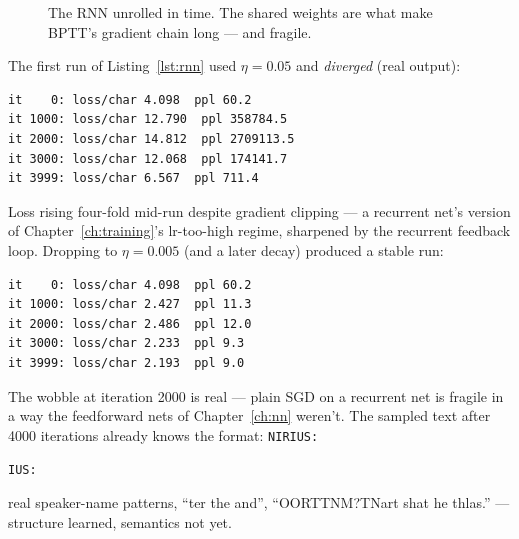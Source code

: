 \begin{figure}[htbp]
\centering
{}
\caption{The RNN unrolled in time. The shared weights are what make
BPTT's gradient chain long --- and fragile.}
\label{fig:unrolled}
\end{figure}



\begin{example}
\label{ex:rnnunstable}
The first run of Listing~\ref{lst:rnn} used $\eta=0.05$ and
\emph{diverged} (real output):
\begin{verbatim}
it    0: loss/char 4.098  ppl 60.2
it 1000: loss/char 12.790  ppl 358784.5
it 2000: loss/char 14.812  ppl 2709113.5
it 3000: loss/char 12.068  ppl 174141.7
it 3999: loss/char 6.567  ppl 711.4
\end{verbatim}
Loss rising four-fold mid-run despite gradient clipping --- a
recurrent net's version of Chapter~\ref{ch:training}'s lr-too-high
regime, sharpened by the recurrent feedback loop. Dropping to
$\eta=0.005$ (and a later decay) produced a stable run:
\begin{verbatim}
it    0: loss/char 4.098  ppl 60.2
it 1000: loss/char 2.427  ppl 11.3
it 2000: loss/char 2.486  ppl 12.0
it 3000: loss/char 2.233  ppl 9.3
it 3999: loss/char 2.193  ppl 9.0
\end{verbatim}
The wobble at iteration 2000 is real --- plain SGD on a recurrent net
is fragile in a way the feedforward nets of Chapter~\ref{ch:nn}
weren't. The sampled text after 4000 iterations already knows the
format: \texttt{NIRIUS:}\par\texttt{IUS:}\par real speaker-name
patterns, ``ter the and'', ``OORTTNM?TNart shat he thlas.'' ---
structure learned, semantics not yet.
\end{example}


